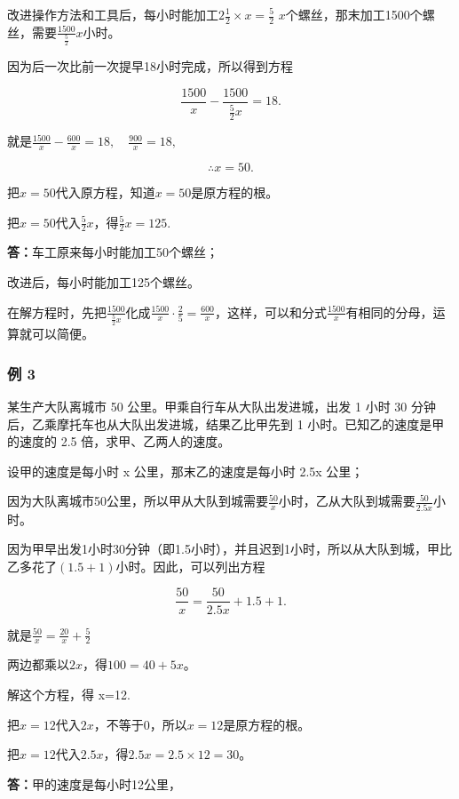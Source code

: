 改进操作方法和工具后，每小时能加工\(2\frac{1}{2} \times x = \frac{5}{2}\) \(x\)个螺丝，那末加工1500个螺丝，需要\(\frac{1500}{\frac{5}{2}} x\)小时。

因为后一次比前一次提早18小时完成，所以得到方程

\[
\frac{1500}{x} - \frac{1500}{\frac{5}{2} x} = 18.
\]

就是\(\frac{1500}{x} -\frac{600}{x} = 18,\quad \frac{900}{x} = 18,\)

\[
\therefore x = 50.
\]

把\(x = 50\)代入原方程，知道\(x = 50\)是原方程的根。

把\(x = 50\)代入\(\frac{5}{2} x\)，得\(\frac{5}{2} x = 125.\)

\textbf{答：}车工原来每小时能加工50个螺丝；

改进后，每小时能加工125个螺丝。

在解方程时，先把\(\frac{1500}{\frac{5}{2}x}\)化成\(\frac{1500}{x} \cdot \frac{2}{5} = \frac{600}{x}\)，这样，可以和分式\(\frac{1500}{x}\)有相同的分母，运算就可以简便。

\subsubsection{例 3}

某生产大队离城市 50 公里。甲乘自行车从大队出发进城，出发 1 小时 30
分钟后，乙乘摩托车也从大队出发进城，结果乙比甲先到 1
小时。已知乙的速度是甲的速度的 2.5 倍，求甲、乙两人的速度。

 设甲的速度是每小时 x 公里，那末乙的速度是每小时 2.5x
公里；

因为大队离城市50公里，所以甲从大队到城需要\(\frac{50}{x}\)小时，乙从大队到城需要\(\frac{50}{2.5x}\)小时。

因为甲早出发1小时30分钟（即1.5小时），并且迟到1小时，所以从大队到城，甲比乙多花了\((1.5+1)\)小时。因此，可以列出方程

\[
\frac{50}{x} = \frac{50}{2.5 x} + 1.5 + 1.
\]

就是\(\frac{50}{x} = \frac{20}{x} +\frac{5}{2}\)

两边都乘以\(2x\)，得\(100 = 40 + 5x\)。

解这个方程，得 x=12.

把\(x = 12\)代入\(2x\)，不等于0，所以\(x = 12\)是原方程的根。

把\(x = 12\)代入\(2.5x\)，得\(2.5x = 2.5 \times 12 = 30\)。

\textbf{答：}甲的速度是每小时12公里，

